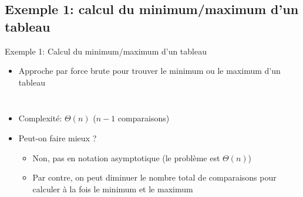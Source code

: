 \subsection{Exemple 1: calcul du minimum/maximum d'un tableau}

\begin{frame}{Exemple 1: Calcul du minimum/maximum d'un tableau}

\begin{itemize}
\item Approche par force brute pour trouver le minimum ou le maximum d'un tableau
\end{itemize}

\begin{columns}
\begin{column}{5cm}
\begin{center}
{\small
{}
}
\end{center}
\end{column}
\begin{column}{5cm}
\begin{center}
{\small
{}
}
\end{center}
\end{column}
\end{columns}

\bigskip

\begin{itemize}
\item Complexité: $\Theta(n)$ ($n-1$ comparaisons)
\item Peut-on faire mieux ?
\begin{itemize}
\item<2> Non, pas en notation asymptotique (le problème est $\Theta(n)$)
\item<2> Par contre, on peut diminuer le nombre total de comparaisons pour calculer à la fois le minimum et le maximum
\end{itemize}
\end{itemize}

\end{frame}

